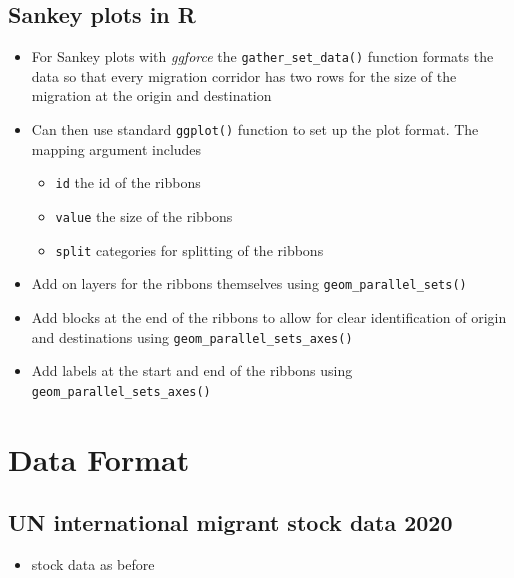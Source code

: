 \documentclass[
]{book}
\providecommand{\tightlist}{%
  \setlength{\itemsep}{0pt}\setlength{\parskip}{0pt}}
\begin{document}
\hypertarget{sankey-plots-in-r-1}{%
\subsection{Sankey plots in R}\label{sankey-plots-in-r-1}}

\begin{itemize}
\tightlist
\item
  For Sankey plots with \emph{ggforce} the \texttt{gather\_set\_data()} function formats the data so that every migration corridor has two rows for the size of the migration at the origin and destination
\item
  Can then use standard \texttt{ggplot()} function to set up the plot format. The mapping argument includes

  \begin{itemize}
  \tightlist
  \item
    \texttt{id} the id of the ribbons
  \item
    \texttt{value} the size of the ribbons
  \item
    \texttt{split} categories for splitting of the ribbons
  \end{itemize}
\item
  Add on layers for the ribbons themselves using \texttt{geom\_parallel\_sets()}
\item
  Add blocks at the end of the ribbons to allow for clear identification of origin and destinations using \texttt{geom\_parallel\_sets\_axes()}
\item
  Add labels at the start and end of the ribbons using \texttt{geom\_parallel\_sets\_axes()}
\end{itemize}

\hypertarget{data-format}{%
\section{Data Format}\label{data-format}}

\hypertarget{un-international-migrant-stock-data-2020-3}{%
\subsection{UN international migrant stock data 2020}\label{un-international-migrant-stock-data-2020-3}}

\begin{itemize}
\tightlist
\item
  \citet{UNPD2020} stock data as before
\end{itemize}
\end{document}
